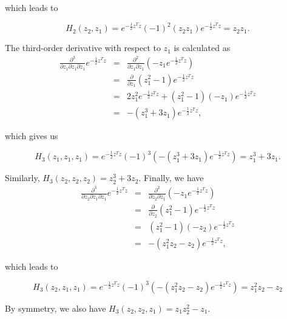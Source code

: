 \documentclass[11pt]{article}
\numberwithin{equation}{section}
\begin{document}
\begin{appendix}
which leads to

\begin{equation}
H_2(z_2, z_1) = e^{-\frac{1}{2} z^T z} (-1)^2 (z_2 z_1 ) e^{-\frac{1}{2} z^T z} = z_2 z_1.
\end{equation}

The third-order derivative with respect to $z_1$ is calculated as
\begin{eqnarray}
\frac{\partial^3}{\partial z_1 \partial z_1 \partial z_1} e^{-\frac{1}{2} z^T z} & = & \frac{\partial^2}{\partial z_1 \partial z_1} \left( -z_1 e^{-\frac{1}{2} z^T z} \right) \nonumber \\
& = & \frac{\partial}{\partial z_1} \left( z_1^2 - 1 \right) e^{-\frac{1}{2} z^T z} \nonumber \\
& = & 2 z_1^2 e^{-\frac{1}{2} z^T z} + (z_1^2 - 1) (-z_1) e^{-\frac{1}{2} z^T z} \nonumber \\
& = & -( z_1^3 + 3 z_1) e^{-\frac{1}{2} z^T z},
\end{eqnarray}

which gives us

\begin{equation}
H_3(z_1, z_1, z_1) = e^{-\frac{1}{2} z^T z} (-1)^3 \left( -( z_1^3 + 3 z_1) e^{-\frac{1}{2} z^T z} \right) = z_1^3 + 3 z_1.
\end{equation}

Similarly, $H_3(z_2, z_2, z_2) = z_2^3 + 3 z_2$. Finally, we have
\begin{eqnarray*}
\frac{\partial^3}{\partial z_2 \partial z_1 \partial z_1} e^{-\frac{1}{2} z^T z} & = & \frac{\partial^2}{\partial z_2 \partial z_1} \left( -z_1 e^{-\frac{1}{2} z^T z} \right) \nonumber \\
& = & \frac{\partial}{\partial z_2} \left( z_1^2 - 1 \right) e^{-\frac{1}{2} z^T z} \nonumber \\
& = & (z_1^2 - 1) (-z_2) e^{-\frac{1}{2} z^T z} \nonumber \\
& = & -( z_1^2 z_2 - z_2) e^{-\frac{1}{2} z^T z},
\end{eqnarray*}

which leads to

\begin{equation}
H_3(z_2, z_1, z_1) = e^{-\frac{1}{2} z^T z} (-1)^3 \left( -(z_1^2 z_2 - z_2) e^{-\frac{1}{2} z^T z} \right) = z_1^2 z_2 - z_2
\end{equation}

By symmetry, we also have $H_3(z_2, z_2, z_1) = z_1 z_2^2 - z_1$.

\


\end{appendix}
\end{document}
